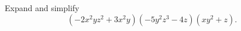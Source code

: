 Expand and simplify
\[
\left(-2x^{2}yz^2+3x^2y\right)\left(-5y^2z^3-4z\right)\left(xy^2+z\right).
\]
